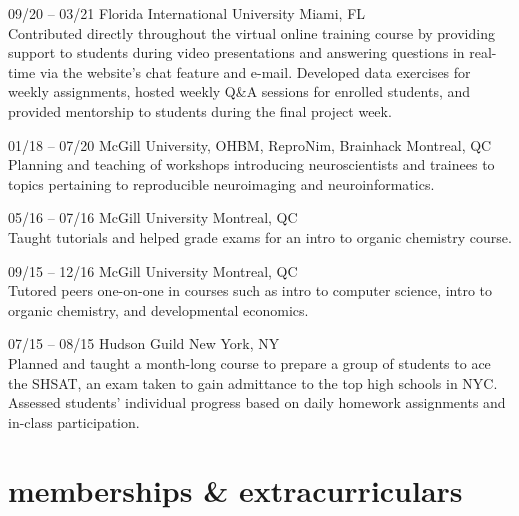 \documentclass[]{friggeri-cv} %
\begin{document}
\begin{entrylist}

\entry
{09/20 -- 03/21}
{Florida International University}
{Miami, FL}
{ \\
Contributed directly throughout the virtual online training course by providing support to students
during video presentations and answering questions in real-time via the website’s chat
feature and e-mail. Developed data exercises for weekly assignments, hosted weekly Q\&A sessions for enrolled students, 
and provided mentorship to students during the final project week.}


\entry
{01/18 -- 07/20}
{McGill University, OHBM, ReproNim, Brainhack}
{Montreal, QC}
{ \\
Planning and teaching of workshops introducing neuroscientists and trainees to
topics pertaining to reproducible neuroimaging and neuroinformatics.}

\entry
{05/16 -- 07/16}
{McGill University}
{Montreal, QC}
{ \\
Taught tutorials and helped grade exams for an intro to organic chemistry course.
}

\entry
{09/15 -- 12/16}
{McGill University}
{Montreal, QC}
{ \\
Tutored peers one-on-one in courses such as intro to computer science, intro to organic chemistry,
and developmental economics.
}

\entry
{07/15 -- 08/15}
{Hudson Guild}
{New York, NY}
{ \\
Planned and taught a month-long course to prepare a group of students to ace the SHSAT, 
an exam taken to gain admittance to the top high schools in NYC. Assessed students'
individual progress based on daily homework assignments and in-class participation.}

\end{entrylist}

%

\section{memberships \& extracurriculars}
\end{document}
